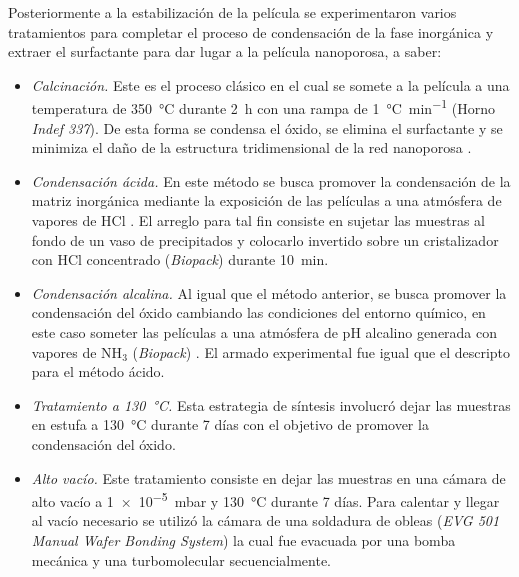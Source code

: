 		Posteriormente a la estabilización de la película se experimentaron varios tratamientos para completar el proceso de condensación de la fase inorgánica y extraer el surfactante para dar lugar a la película nanoporosa, a saber:

				\begin{itemize}

				\item \textit{Calcinación.} Este es el proceso clásico en el cual se somete a la película a una temperatura de \SI{350}{\celsius} durante \SI{2}{\hour} con una rampa de \SI{1}{\celsius.\minute^{-1}} (Horno \textit{Indef 337}). De esta forma se condensa el óxido, se elimina el surfactante y se minimiza el daño de la estructura tridimensional de la red nanoporosa \cite{Crepaldi2003}.

				\item \textit{Condensación ácida.} En este método se busca promover la condensación de la matriz inorgánica mediante la exposición de las películas a una atmósfera de vapores de HCl \cite{Doshi2000a}. El arreglo para tal fin consiste en sujetar las muestras al fondo de un vaso de precipitados y colocarlo invertido sobre un cristalizador con HCl concentrado (\textit{Biopack}) durante \SI{10}{\minute}. 

				\item \textit{Condensación alcalina.} Al igual que el método anterior, se busca promover la condensación del óxido cambiando las condiciones del entorno químico, en este caso someter las películas a una atmósfera de pH alcalino generada con vapores de NH$_3$ (\textit{Biopack}) \cite{Soler-Illia2012,Soler-Illia2011}. El armado experimental fue igual que el descripto para el método ácido.

				\item \textit{Tratamiento a \SI{130}{\celsius}.} Esta estrategia de síntesis involucró dejar las muestras en estufa a \SI{130}{\celsius} durante 7 días con el objetivo de promover la condensación del óxido.

				\item \textit{Alto vacío.} Este tratamiento consiste en dejar las muestras en una cámara de alto vacío a \SI{1e-5}{\milli\bar} y \SI{130}{\celsius} durante 7 días. Para calentar y llegar al vacío necesario se utilizó la cámara de una soldadura de obleas (\textit{EVG 501 Manual Wafer Bonding System}) la cual fue evacuada por una bomba mecánica y una turbomolecular secuencialmente.

				\end{itemize}
					
